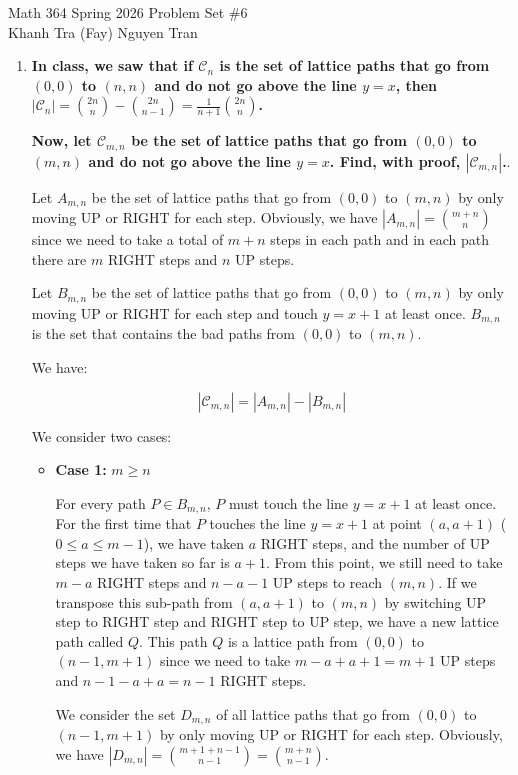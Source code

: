 \documentclass[10pt]{article}
\begin{document}
\begin{center}
Math 364 \quad Spring 2026 \quad Problem Set \#6\\
Khanh Tra (Fay) Nguyen Tran
\end{center}

\begin{enumerate}

\item
\textbf{In class, we saw that if $\mathcal{C}_n$ is the set of lattice paths that go from $(0,0)$ to $(n,n)$ and do not go above the line $y=x$, then $|\mathcal{C}_n|= \binom{2n}{n}-\binom{2n}{n-1} = \frac{1}{n+1}\binom{2n}{n}$.}

\textbf{Now, let $\mathcal{C}_{m,n}$ be the set of lattice paths that go from $(0,0)$ to $(m,n)$ and do not go above the line $y=x$.  Find, with proof, $|\mathcal{C}_{m,n}|$.}.

Let $A_{m,n}$ be the set of lattice paths that go from $(0,0)$ to $(m,n)$ by only moving UP or RIGHT for each step. Obviously, we have $|A_{m,n}| = \binom{m+n}{n}$ since we need to take a total of $m+n$ steps in each path and in each path there are $m$ RIGHT steps and $n$ UP steps.

Let $B_{m,n}$ be the set of lattice paths that go from $(0,0)$ to $(m,n)$ by only moving UP or RIGHT for each step and touch $y = x + 1$ at least once. $B_{m,n}$ is the set that contains the bad paths from $(0,0)$ to $(m,n)$. 

We have: 

$$|\mathcal{C}_{m,n}| = |A_{m,n}| - |B_{m,n}|$$

We consider two cases:

\begin{itemize}
    \item \textbf{Case 1:} $m \geq n $

For every path $P \in B_{m,n}$, $P$ must touch the line $y=x+1$ at least once. For the first time that $P$ touches the line $y=x+1$ at point $(a,a+1)$ ($0 \leq a \leq m - 1$), we have taken $a$ RIGHT steps, and the number of UP steps we have taken so far is $a+1$. From this point, we still need to take $m - a$ RIGHT steps and $n-a-1$ UP steps to reach $(m,n)$. If we transpose this sub-path from $(a,a+1)$ to $(m,n)$ by switching UP step to RIGHT step and RIGHT step to UP step, we have a new lattice path called $Q$. This path $Q$ is a lattice path from $(0,0)$ to $(n-1, m + 1)$ since we need to take $m-a + a + 1 = m+1$ UP steps and $n - 1- a + a= n - 1$ RIGHT steps.

We consider the set $D_{m,n}$ of all lattice paths that go from $(0,0)$ to $(n-1, m + 1)$ by only moving UP or RIGHT for each step. Obviously, we have $|D_{m,n}| = \binom{m+1+n-1}{n-1}=\binom{m+n}{n-1}$.


\end{itemize}
\end{enumerate}
\end{document}
